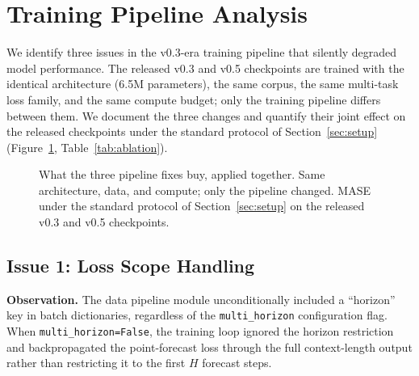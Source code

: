 \documentclass[11pt]{article}
\begin{document}
\section{Training Pipeline Analysis}
\label{sec:pipeline}

We identify three issues in the v0.3-era training pipeline that silently degraded model performance. The released v0.3 and v0.5 checkpoints are trained with the identical architecture (6.5M parameters), the same corpus, the same multi-task loss family, and the same compute budget; only the training pipeline differs between them. We document the three changes and quantify their joint effect on the released checkpoints under the standard protocol of Section~\ref{sec:setup} (Figure~\ref{fig:ablation_overview}, Table~\ref{tab:ablation}).

\begin{figure}[t]
\centering
{}
\caption{What the three pipeline fixes buy, applied together. Same architecture, data, and compute; only the pipeline changed. MASE under the standard protocol of Section~\ref{sec:setup} on the released v0.3 and v0.5 checkpoints.}
\label{fig:ablation_overview}
\end{figure}

\subsection{Issue 1: Loss Scope Handling}
\label{sec:issue1}

\textbf{Observation.} The data pipeline module unconditionally included a ``horizon'' key in batch dictionaries, regardless of the \texttt{multi\_horizon} configuration flag. When \texttt{multi\_horizon=False}, the training loop ignored the horizon restriction and backpropagated the point-forecast loss through the full context-length output rather than restricting it to the first $H$ forecast steps.
\end{document}
